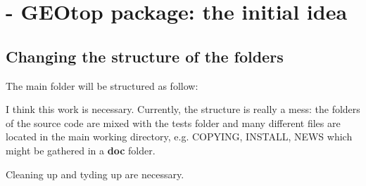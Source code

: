 \section{ - GEOtop package: the initial idea}\label{sec:20150624}
\subsection{Changing the structure of the folders}

The main folder will be structured as follow:

\vspace{10pt}



\noindent I think this work is necessary. Currently, the structure is
really a mess: the folders of the source code are mixed with the tests
folder and many different files are located in the main working
directory, e.g. COPYING, INSTALL, NEWS which might be gathered in a
\textbf{doc} folder.\par\medskip

\noindent Cleaning up and tyding up are necessary.